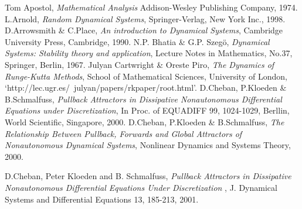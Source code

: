 
\begin{thebibliography}{99}
  Tom Apostol,
  \emph{Mathematical Analysis}
  Addison-Wesley Publishing Company, 1974.
  L.Arnold,
  \emph{Random Dynamical Systems},
  Springer-Verlag, New York Inc., 1998.
  D.Arrowsmith \& C.Place,
  \emph{An introduction to Dynamical Systems},
  Cambridge University Press, Cambridge, 1990.
  N.P. Bhatia \& G.P. Szeg\"{o},
  \emph{Dynamical Systems: Stability theory and application},
  Lecture Notes in Mathematics, No.37, Springer, Berlin, 1967.
  Julyan Cartwright \& Oreste Piro,
  \emph{The Dynamics of Runge-Kutta Methods},
  School of Mathematical Sciences,
  University of London,
  `http://lec.ugr.es/~julyan/papers/rkpaper/root.html'.
  D.Cheban, P.Kloeden \& B.Schmalfuss,
  \emph{Pullback Attractors in Dissipative Nonautonomous Differential Equations
               under Discretization},
  In Proc. of EQUADIFF 99,  1024-1029, Berllin,
  World Scientific, Singapore,  2000.
  D.Cheban, P.Kloeden \& B.Schmalfuss,
  \emph{The Relationship Between Pullback, Forwards and Global Attractors of
                  Nonautonomous Dynamical Systems},
  Nonlinear Dynamics and Systems Theory, 2000.

  D.Cheban, Peter Kloeden and B. Schmalfuss,
  \emph{Pullback Attractors in Dissipative Nonautonomous Differential Equations
       Under Discretization} , J. Dynamical Systems and Differential Equations 13, 185-213, 2001.


\end{thebibliography}
